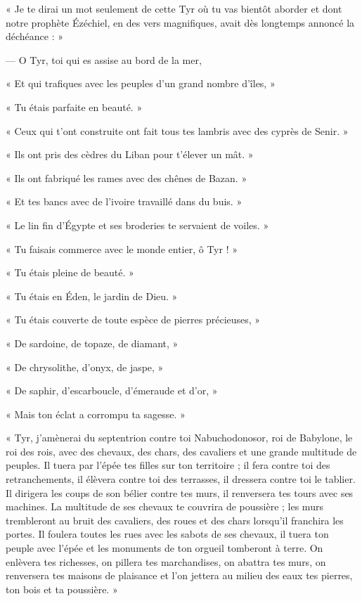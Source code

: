 \documentclass[a4paper, 11pt, oneside, polutonikogreek, french]{article}
\begin{document}
« Je te dirai un mot seulement de cette Tyr où tu vas bientôt aborder et dont notre prophète Ézéchiel, en des vers magnifiques, avait dès longtemps annoncé la déchéance : »

\bigskip
\centerline{\EightStarTaper}
\centerline{\EightStarTaper\EightStarTaper}
\bigskip

--- O Tyr, toi qui es assise au bord de la mer,

« Et qui trafiques avec les peuples d'un grand nombre d'îles, »

« Tu étais parfaite en beauté. »

« Ceux qui t'ont construite ont fait tous tes lambris avec des cyprès de Senir. »

« Ils ont pris des cèdres du Liban pour t'élever un mât. »

« Ils ont fabriqué les rames avec des chênes de Bazan. »

« Et tes bancs avec de l'ivoire travaillé dans du buis. »

« Le lin fin d'Égypte et ses broderies te servaient de voiles. »

« Tu faisais commerce avec le monde entier, ô Tyr ! »

« Tu étais pleine de beauté. »

« Tu étais en Éden, le jardin de Dieu. »

« Tu étais couverte de toute espèce de pierres précieuses, »

« De sardoine, de topaze, de diamant, »

« De chrysolithe, d'onyx, de jaspe, »

« De saphir, d'escarboucle, d'émeraude et d'or, »

« Mais ton éclat a corrompu ta sagesse. »

« Tyr, j'amènerai du septentrion contre toi Nabuchodonosor, roi de Babylone, le roi des rois, avec des chevaux, des chars, des cavaliers et une grande multitude de peuples. Il tuera par l'épée tes filles sur ton territoire ; il fera contre toi des retranchements, il élèvera contre toi des terrasses, il dressera contre toi le tablier. Il dirigera les coups de son bélier contre tes murs, il renversera tes tours avec ses machines. La multitude de ses chevaux te couvrira de poussière ; les murs trembleront au bruit des cavaliers, des roues et des chars lorsqu'il franchira les portes. Il foulera toutes les rues avec les sabots de ses chevaux, il tuera ton peuple avec l'épée et les monuments de ton orgueil tomberont à terre. On enlèvera tes richesses, on pillera tes marchandises, on abattra tes murs, on renversera tes maisons de plaisance et l'on jettera au milieu des eaux tes pierres, ton bois et ta poussière. »
\end{document}
